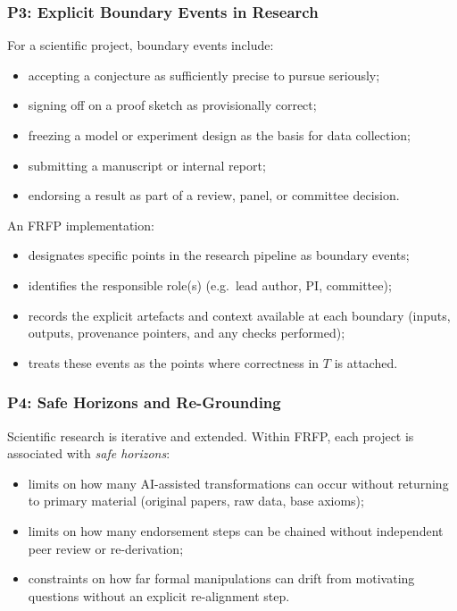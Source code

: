\subsubsection*{P3: Explicit Boundary Events in Research}

For a scientific project, boundary events include:

\begin{itemize}
  \item accepting a conjecture as sufficiently precise to pursue seriously;
  \item signing off on a proof sketch as provisionally correct;
  \item freezing a model or experiment design as the basis for data collection;
  \item submitting a manuscript or internal report;
  \item endorsing a result as part of a review, panel, or committee decision.
\end{itemize}

An FRFP implementation:

\begin{itemize}
  \item designates specific points in the research pipeline as boundary events;
  \item identifies the responsible role(s) (e.g.\ lead author, PI, committee);
  \item records the explicit artefacts and context available at each boundary (inputs, outputs,
        provenance pointers, and any checks performed);
  \item treats these events as the points where correctness in $T$ is attached.
\end{itemize}

\subsubsection*{P4: Safe Horizons and Re-Grounding}

Scientific research is iterative and extended.
Within FRFP, each project is associated with \emph{safe horizons}:

\begin{itemize}
  \item limits on how many AI-assisted transformations can occur without
        returning to primary material (original papers, raw data, base axioms);
  \item limits on how many endorsement steps can be chained without independent
        peer review or re-derivation;
  \item constraints on how far formal manipulations can drift from motivating
        questions without an explicit re-alignment step.
\end{itemize}

